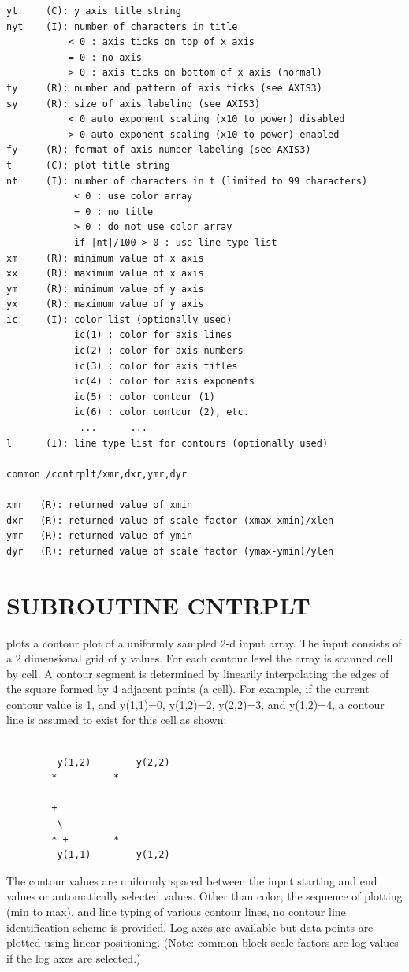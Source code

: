 \documentclass[11pt]{report}
\begin{document}
\begin{verbatim}
yt     (C): y axis title string
nyt    (I): number of characters in title
           < 0 : axis ticks on top of x axis
           = 0 : no axis
           > 0 : axis ticks on bottom of x axis (normal)
ty     (R): number and pattern of axis ticks (see AXIS3)
sy     (R): size of axis labeling (see AXIS3)
           < 0 auto exponent scaling (x10 to power) disabled
           > 0 auto exponent scaling (x10 to power) enabled
fy     (R): format of axis number labeling (see AXIS3)
t      (C): plot title string
nt     (I): number of characters in t (limited to 99 characters)
            < 0 : use color array
            = 0 : no title
            > 0 : do not use color array
            if |nt|/100 > 0 : use line type list
xm     (R): minimum value of x axis
xx     (R): maximum value of x axis
ym     (R): minimum value of y axis
yx     (R): maximum value of y axis
ic     (I): color list (optionally used)
            ic(1) : color for axis lines
            ic(2) : color for axis numbers
            ic(3) : color for axis titles
            ic(4) : color for axis exponents
            ic(5) : color contour (1)
            ic(6) : color contour (2), etc.
             ...      ...
l      (I): line type list for contours (optionally used)

common /ccntrplt/xmr,dxr,ymr,dyr

xmr   (R): returned value of xmin
dxr   (R): returned value of scale factor (xmax-xmin)/xlen
ymr   (R): returned value of ymin
dyr   (R): returned value of scale factor (ymax-ymin)/ylen
\end{verbatim}

\newpage
\section{SUBROUTINE CNTRPLT}

 plots a contour plot of a uniformly sampled 2-d input
array.  The input consists of a 2 dimensional grid of y values.  For each
contour level the array is scanned cell by cell.
A contour segment is determined by linearily interpolating the edges of the
square formed by 4 adjacent points (a cell).  For example, if the current
contour value is 1, and y(1,1)=0, y(1,2)=2, y(2,2)=3, and y(1,2)=4,
a contour line is assumed to exist for this cell as shown:
\begin{verbatim}

         y(1,2)        y(2,2)
        *          *

        +
         \
        * +        *
         y(1,1)        y(1,2)

\end{verbatim}
The contour values are uniformly spaced between the input starting
and end values or automatically selected values.  Other than color, the
sequence of plotting (min to max), and line typing of various contour
lines, no contour line identification scheme is
provided. Log axes are available but data points are plotted using
linear positioning.  (Note: common block scale factors are log values
if the log axes are selected.)
\end{document}
